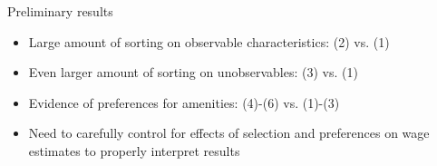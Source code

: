 \documentclass[english,final,t]{beamer}
\begin{document}
\begin{frame}{}
\begin{part}{}
\begin{columns}[t]
\begin{column}{.22\linewidth}
      \begin{block}{Preliminary results}
        \begin{itemize}
        \item Large amount of sorting on observable characteristics: (2) vs. (1)
				\item Even larger amount of sorting on unobservables: (3) vs. (1)
        \item Evidence of preferences for amenities: (4)-(6) vs. (1)-(3)
        \item Need to carefully control for effects of selection and preferences on wage estimates to properly interpret results
        \end{itemize}
        \vspace{-1ex}
      \end{block}

    \end{column}
  \end{columns}
\end{part}
\vspace{2ex}
\begin{part}{}

  \begin{columns}[t]
    \begin{column}{.22\linewidth}



\end{column}
\end{columns}
\end{part}
\end{frame}
\end{document}
